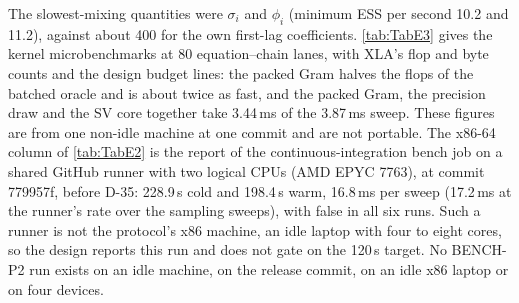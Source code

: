The slowest-mixing quantities were $\sigma_i$ and $\phi_i$ (minimum ESS per second 10.2 and 11.2),
against about 400 for the own first-lag coefficients.
\cref{tab:TabE3} gives the kernel microbenchmarks at 80 equation--chain lanes, with XLA's flop
and byte counts and the design budget lines: the packed Gram halves the flops of the batched oracle
and is about twice as fast, and the packed Gram, the precision draw and the SV core together take
3.44\,ms of the 3.87\,ms sweep.
These figures are from one non-idle machine at one commit and are not portable.
The x86-64 column of \cref{tab:TabE2} is the report of the continuous-integration bench job on a
shared GitHub runner with two logical CPUs (AMD EPYC 7763), at commit 779957f, before D-35:
228.9\,s cold and 198.4\,s warm, 16.8\,ms per sweep (17.2\,ms at the runner's rate over the
sampling sweeps), with  false in all six runs. Such a runner is not the protocol's
x86 machine, an idle laptop with four to eight cores, so the design reports this run and does not
gate on the 120\,s target.
No BENCH-P2 run exists on an idle machine, on the release commit, on an idle x86 laptop or on four
devices.

\begin{table}[!htbp]
\centering\small
\caption{BENCH-P2 on the production engine, on the reference Apple M5 Max (not idle) and on a
2-vCPU x86-64 continuous-integration runner (reported, not gated): wall time cold and warm,
compilation time, time per sweep, peak RSS, ESS and ESS per second by quantity group, the
convergence flag, and the machines, load and commits.}
\label{tab:TabE2}

\end{table}

